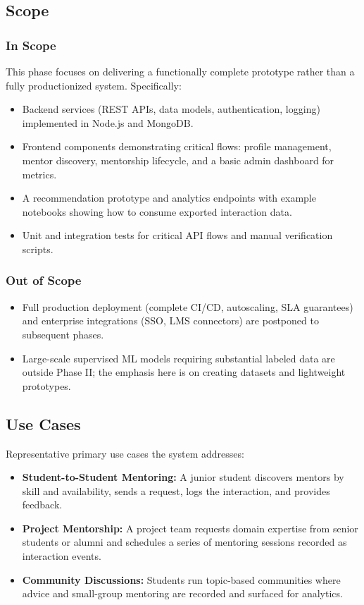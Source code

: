 \documentclass[12pt,singleside,a4paper]{article}
\begin{document}
\subsection{Scope}
\subsubsection{In Scope}
This phase focuses on delivering a functionally complete prototype rather than a fully productionized system. Specifically:
\begin{itemize}
  \item Backend services (REST APIs, data models, authentication, logging) implemented in Node.js and MongoDB.
  \item Frontend components demonstrating critical flows: profile management, mentor discovery, mentorship lifecycle, and a basic admin dashboard for metrics.
  \item A recommendation prototype and analytics endpoints with example notebooks showing how to consume exported interaction data.
  \item Unit and integration tests for critical API flows and manual verification scripts.
\end{itemize}

\subsubsection{Out of Scope}
\begin{itemize}
  \item Full production deployment (complete CI/CD, autoscaling, SLA guarantees) and enterprise integrations (SSO, LMS connectors) are postponed to subsequent phases.
  \item Large-scale supervised ML models requiring substantial labeled data are outside Phase II; the emphasis here is on creating datasets and lightweight prototypes.
\end{itemize}

\subsection{Use Cases}
Representative primary use cases the system addresses:
\begin{itemize}
  \item \textbf{Student-to-Student Mentoring:} A junior student discovers mentors by skill and availability, sends a request, logs the interaction, and provides feedback.
  \item \textbf{Project Mentorship:} A project team requests domain expertise from senior students or alumni and schedules a series of mentoring sessions recorded as interaction events.
  \item \textbf{Community Discussions:} Students run topic-based communities where advice and small-group mentoring are recorded and surfaced for analytics.
\end{itemize}
\end{document}

